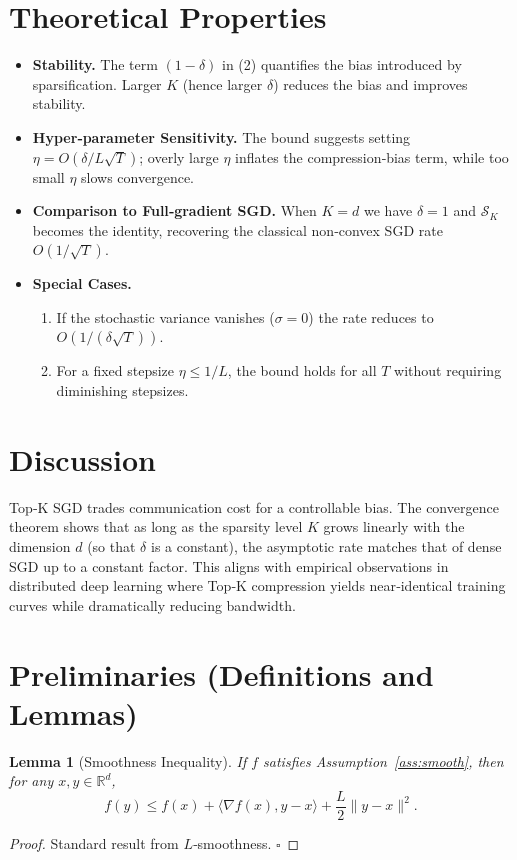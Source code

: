 \documentclass{article}
\newtheorem{lemma}{Lemma}
\newcommand{\R}{\mathbb{R}}
\newcommand{\cK}{\mathcal{S}_K}
\begin{document}
\section*{Theoretical Properties}
\begin{itemize}
\item \textbf{Stability.} The term $(1-\delta)$ in (2) quantifies the bias introduced by sparsification. Larger $K$ (hence larger $\delta$) reduces the bias and improves stability.
\item \textbf{Hyper‑parameter Sensitivity.} The bound suggests setting $\eta=O(\delta/L\sqrt{T})$; overly large $\eta$ inflates the compression‑bias term, while too small $\eta$ slows convergence.
\item \textbf{Comparison to Full‑gradient SGD.} When $K=d$ we have $\delta=1$ and $\cK$ becomes the identity, recovering the classical non‑convex SGD rate $O(1/\sqrt{T})$.
\item \textbf{Special Cases.}
    \begin{enumerate}
        \item If the stochastic variance vanishes ($\sigma=0$) the rate reduces to $O(1/(\delta\sqrt{T}))$.
        \item For a fixed stepsize $\eta\le 1/L$, the bound holds for all $T$ without requiring diminishing stepsizes.
    \end{enumerate}
\end{itemize}

\section*{Discussion}
Top‑K SGD trades communication cost for a controllable bias. The convergence theorem shows that as long as the sparsity level $K$ grows linearly with the dimension $d$ (so that $\delta$ is a constant), the asymptotic rate matches that of dense SGD up to a constant factor. This aligns with empirical observations in distributed deep learning where Top‑K compression yields near‑identical training curves while dramatically reducing bandwidth.

\newpage
\section*{Preliminaries (Definitions and Lemmas)}
\begin{lemma}[Smoothness Inequality]\label{lem:smooth}
If $f$ satisfies Assumption~\ref{ass:smooth}, then for any $x,y\in\R^{d}$,
\[
f(y)\le f(x)+\langle\nabla f(x),y-x\rangle+\frac{L}{2}\|y-x\|^{2}.
\]
\end{lemma}
\begin{proof}
Standard result from $L$‑smoothness. \hfill $\square$
\end{proof}
\end{document}
